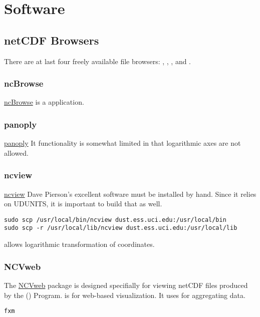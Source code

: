\documentclass[12pt,twoside]{article}
\begin{document}

\section{Software}\label{sxn:sw}
\subsection{netCDF Browsers}\label{sxn:ncbrws}
There are at last four freely available  file
browsers: , , , and
.  

\subsubsection{ncBrowse}\label{sxn:ncBrowse}
\href{http://plover.wrc.noaa.gov/java/ncBrowse}{ncBrowse}
 is a  application.

\subsubsection{panoply}\label{sxn:panoply}
\href{http://www.giss.nasa.gov/tools/panoply}{panoply}
It functionality is somewhat limited in that logarithmic axes are not
allowed. 

\subsubsection{ncview}\label{sxn:ncview}
\href{http://meteora.ucsd.edu}{ncview}
Dave Pierson's excellent  software must be installed by
hand. 
Since it relies on UDUNITS, it is important to build that as well.
\begin{verbatim}
sudo scp /usr/local/bin/ncview dust.ess.uci.edu:/usr/local/bin
sudo scp -r /usr/local/lib/ncview dust.ess.uci.edu:/usr/local/lib
\end{verbatim}
 allows logarithmic transformation of coordinates.

\subsubsection{NCVweb}\label{sxn:NCVweb}
The \href{http://arm.mrcsb.com}{NCVweb} package is designed
specifially for viewing netCDF files produced by the 
 () Program. 
 is for web-based visualization.
It uses  for aggregating data.
\begin{verbatim}
fxm
\end{verbatim}
\end{document}

